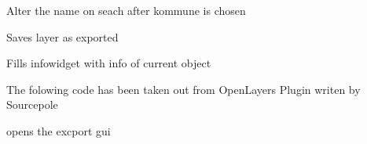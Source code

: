 \documentclass[letterpaper,10pt,english]{sphinxmanual}
\begin{document}
\begin{fulllineitems}

\begin{fulllineitems}
\label{\detokenize{code:Tilgjengelighet.Tilgjengelighet.komune_valgt}}
Alter the name on seach after kommune is chosen

\end{fulllineitems}


\begin{fulllineitems}
\label{\detokenize{code:Tilgjengelighet.Tilgjengelighet.lagre_lag}}
Saves layer as exported

\end{fulllineitems}


\begin{fulllineitems}
\label{\detokenize{code:Tilgjengelighet.Tilgjengelighet.obj_info}}
Fills infowidget with info of current object

\end{fulllineitems}


\begin{fulllineitems}
\label{\detokenize{code:Tilgjengelighet.Tilgjengelighet.openLayer_background_init}}
The folowing code has been taken out from OpenLayers Plugin writen by Sourcepole

\end{fulllineitems}


\begin{fulllineitems}
\label{\detokenize{code:Tilgjengelighet.Tilgjengelighet.open_export_layer_dialog}}
opens the excport gui

\end{fulllineitems}


\end{fulllineitems}
\end{document}
